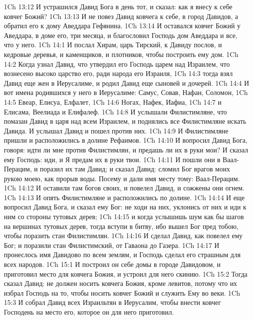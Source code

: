 \vs 1Ch 13:12 И устрашился Давид Бога в день тот, и сказал: как я внесу к себе ковчег Божий?
\vs 1Ch 13:13 И не повез Давид ковчега к себе, в город Давидов, а обратил его к дому Аведдара Гефянина.
\vs 1Ch 13:14 И оставался ковчег Божий у Аведдара, в доме его, три месяца, и благословил Господь дом Аведдара и все, что у него.
\vs 1Ch 14:1 И послал Хирам, царь Тирский, к Давиду послов, и кедровые деревья, и каменщиков, и плотников, чтобы построить ему дом.
\vs 1Ch 14:2 Когда узнал Давид, что утвердил его Господь царем над Израилем, что вознесено высоко царство его, ради народа его Израиля,
\vs 1Ch 14:3 тогда взял Давид еще жен в Иерусалиме, и родил Давид еще сыновей и дочерей.
\vs 1Ch 14:4 И вот имена родившихся у него в Иерусалиме: Самус, Совав, Нафан, Соломон,
\vs 1Ch 14:5 Евеар, Елисуа, Елфалет,
\vs 1Ch 14:6 Ногах, Нафек, Иафиа,
\vs 1Ch 14:7 и Елисама, Веелиада и Елифалеф.
\rsbpar\vs 1Ch 14:8 И услышали Филистимляне, что помазан Давид в царя над всем Израилем, и поднялись все Филистимляне искать Давида. И услышал Давид  и пошел против них.
\vs 1Ch 14:9 И Филистимляне пришли и расположились в долине Рефаимов.
\vs 1Ch 14:10 И вопросил Давид Бога, говоря: идти ли мне против Филистимлян, и предашь ли их в руки мои? И сказал ему Господь: иди, и Я предам их в руки твои.
\vs 1Ch 14:11 И пошли они в Ваал-Перацим, и поразил их там Давид; и сказал Давид: сломил Бог врагов моих рукою моею, как прорыв воды. Посему и дали имя месту тому: Ваал-Перацим.
\vs 1Ch 14:12 И оставили там  богов своих, и повелел Давид, и сожжены они огнем.
\vs 1Ch 14:13 И  опять Филистимляне и расположились по долине.
\vs 1Ch 14:14 И еще вопросил Давид Бога, и сказал ему Бог: не ходи  на них, уклонись от них и иди к ним со стороны тутовых дерев;
\vs 1Ch 14:15 и когда услышишь шум как бы шагов на вершинах тутовых дерев, тогда вступи в битву, ибо вышел Бог пред тобою, чтобы поразить стан Филистимлян.
\vs 1Ch 14:16 И сделал Давид, как повелел ему Бог; и поразили стан Филистимский, от Гаваона до Газера.
\vs 1Ch 14:17 И пронеслось имя Давидово по всем землям, и Господь сделал его страшным для всех народов.
\vs 1Ch 15:1 И построил он себе домы в городе Давидовом, и приготовил место для ковчега Божия, и устроил для него скинию.
\vs 1Ch 15:2 Тогда сказал Давид:  не должен носить ковчега Божия, кроме левитов, потому что их избрал Господь на то, чтобы носить ковчег Божий и служить Ему во веки.
\vs 1Ch 15:3 И собрал Давид всех Израильтян в Иерусалим, чтобы внести ковчег Господень на место его, которое он для него приготовил.
